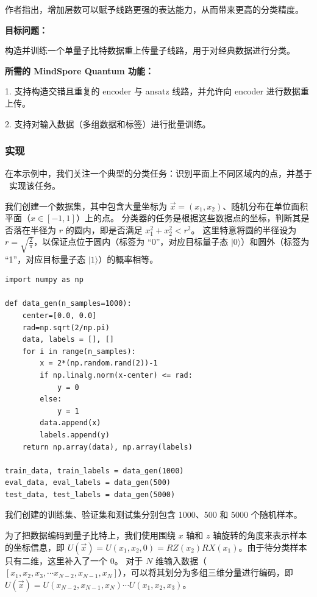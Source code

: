 作者指出，增加层数可以赋予线路更强的表达能力，从而带来更高的分类精度。

\textbf{目标问题：}

构造并训练一个单量子比特数据重上传量子线路，用于对经典数据进行分类。

\textbf{所需的 MindSpore Quantum 功能：}

1. 支持构造交错且重复的 encoder 与 ansatz 线路，并允许向 encoder 进行数据重上传。

2. 支持对输入数据（多组数据和标签）进行批量训练。

\subsubsection{实现}

在本示例中，我们关注一个典型的分类任务：识别平面上不同区域内的点，并基于 \MindQuantum\ 实现该任务。

我们创建一个数据集，其中包含大量坐标为 $\overrightarrow{x}=(x_1, x_2)$、随机分布在单位面积平面（$x\in[-1,1]$）上的点。
分类器的任务是根据这些数据点的坐标，判断其是否落在半径为 $r$ 的圆内，即是否满足 $x_1^2+x_2^2<r^2$。
这里特意将圆的半径设为 $r=\sqrt{\frac{2}{\pi}}$，以保证点位于圆内（标签为 ``0''，对应目标量子态 $|0\rangle$）和圆外（标签为 ``1''，对应目标量子态 $|1\rangle$）的概率相等。

\begin{lstlisting}
import numpy as np

def data_gen(n_samples=1000):
    center=[0.0, 0.0]
    rad=np.sqrt(2/np.pi)
    data, labels = [], []
    for i in range(n_samples):
        x = 2*(np.random.rand(2))-1
        if np.linalg.norm(x-center) <= rad:
            y = 0
        else:
            y = 1
        data.append(x)
        labels.append(y)
    return np.array(data), np.array(labels)

train_data, train_labels = data_gen(1000)
eval_data, eval_labels = data_gen(500)
test_data, test_labels = data_gen(5000)
\end{lstlisting}

我们创建的训练集、验证集和测试集分别包含 1000、500 和 5000 个随机样本。

为了把数据编码到量子比特上，我们使用围绕 $x$ 轴和 $z$ 轴旋转的角度来表示样本的坐标信息，即 $U(\overrightarrow{x})=U(x_1,x_2,0)=RZ(x_2)RX(x_1)$。由于待分类样本只有二维，这里补入了一个 0。
对于 $N$ 维输入数据（$[x_1, x_2, x_3, \cdots x_{N-2}, x_{N-1},x_{N}]$），可以将其划分为多组三维分量进行编码，即 $U(\overrightarrow{x})=U(x_{N-2},x_{N-1},x_{N})\cdots U(x_1,x_2,x_3)$。

